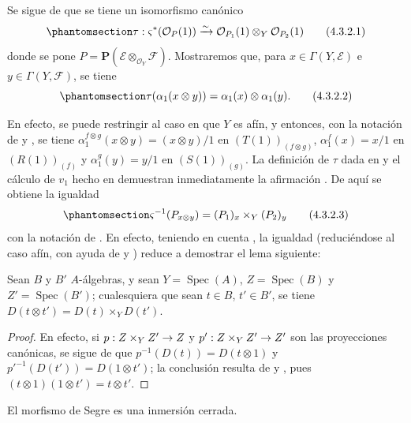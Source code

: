\documentclass[oneside,10pt]{amsart}
\makeatletter
\newcommand{\ega@arrow}[2]{\mathchoice{#1}{#2}{#2}{#2}}
\renewcommand{\to}{\ega@arrow{\longrightarrow}{\rightarrow}}
\let\EGAOriginalLabel\label
\renewcommand{\label}[1]{\phantomsection\EGAOriginalLabel{#1}}
\makeatother
\begin{document}
\begin{env}[4.3.2]
\label{II.4.3.2-fr}
Se sigue de  que se tiene un isomorfismo canónico
\[
\label{II.4.3.2.1-fr}
  \tau:\varsigma^*(\mathcal{O}_P(1))\xrightarrow{\sim}
  \mathcal{O}_{P_1}(1)\otimes_Y\mathcal{O}_{P_2}(1)
\tag{4.3.2.1}
\]
donde se pone $P=\mathbf{P}(\mathcal{E}\otimes_{\mathcal{O}_Y}\mathcal{F})$.
Mostraremos que, para $x\in\Gamma(Y,\mathcal{E})$ e $y\in\Gamma(Y,\mathcal{F})$, se tiene
\[
\label{II.4.3.2.2-fr}
  \tau(\alpha_1(x\otimes y))=\alpha_1(x)\otimes\alpha_1(y).
\tag{4.3.2.2}
\]

En efecto, se puede restringir al caso en que $Y$ es afín, y entonces, con la notación de  y , se tiene $\alpha_1^{f\otimes g}(x\otimes y)=(x\otimes y)/1$ en $(T(1))_{(f\otimes g)}$, $\alpha_1^f(x)=x/1$ en $(R(1))_{(f)}$ y $\alpha_1^g(y)=y/1$ en $(S(1))_{(g)}$.
La definición de $\tau$ dada en  y el cálculo de $v_1$ hecho en  demuestran inmediatamente la afirmación .
De aquí se obtiene la igualdad
\[
\label{II.4.3.2.3-fr}
  \varsigma^{-1}(P_{x\otimes y})=(P_1)_x\times_Y(P_2)_y
\tag{4.3.2.3}
\]
con la notación de .
En efecto, teniendo en cuenta , la igualdad  (reduciéndose al caso afín, con ayuda de  y ) reduce a demostrar el lema siguiente:

\begin{lemma}[4.3.2.4]
\label{II.4.3.2.4-fr}
Sean $B$ y $B'$ $A$-álgebras, y sean $Y=\operatorname{Spec}(A)$, $Z=\operatorname{Spec}(B)$ y $Z'=\operatorname{Spec}(B')$;
cualesquiera que sean $t\in B$, $t'\in B'$, se tiene $D(t\otimes t')=D(t)\times_YD(t')$.
\end{lemma}

\begin{proof}
En efecto, si $p:Z\times_YZ'\to Z$ y $p':Z\times_YZ'\to Z'$ son las proyecciones canónicas, se sigue de  que $p^{-1}(D(t))=D(t\otimes1)$ y $p'^{-1}(D(t'))=D(1\otimes t')$;
la conclusión resulta de  y , pues $(t\otimes1)(1\otimes t')=t\otimes t'$.
\end{proof}
\end{env}

\begin{proposition}[4.3.3]
\label{II.4.3.3-fr}
El morfismo de Segre es una inmersión cerrada.
\end{proposition}
\end{document}

